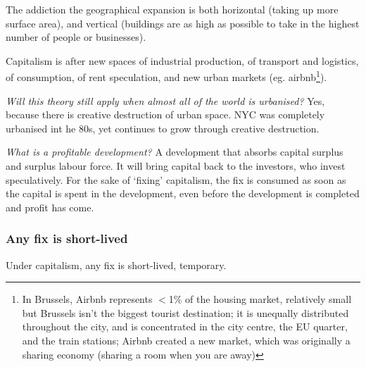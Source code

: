 \documentclass{article}
\begin{document}
The addiction the geographical expansion is both horizontal (taking up more surface area), and vertical (buildings are as high as possible to take in the highest number of people or businesses).

Capitalism is after new spaces of industrial production, of transport and logistics, of consumption, of rent speculation, and new urban markets (eg. airbnb\footnote{In Brussels, Airbnb represents $<$1\% of the housing market, relatively small but Brussels isn't the biggest tourist destination; it is unequally distributed throughout the city, and is concentrated in the city centre, the EU quarter, and the train stations; Airbnb created a new market, which was originally a sharing economy (sharing a room when you are away)}).

\textit{Will this theory still apply when almost all of the world is urbanised?} Yes, because there is creative destruction of urban space. NYC was completely urbanised int he 80s, yet continues to grow through creative destruction. 

\textit{What is a profitable development?} A development that absorbs capital surplus and surplus labour force. It will bring capital back to the investors, who invest speculatively. For the sake of `fixing' capitalism, the fix is consumed as soon as the capital is spent in the development, even before the development is completed and profit has come. 

\subsubsection{Any fix is short-lived}

Under capitalism, any fix is short-lived, temporary. 
\end{document}
